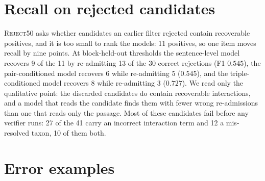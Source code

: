 \documentclass[11pt]{article}
\begin{document}
\section{Recall on rejected candidates}
\label{sec:recall}
\textsc{Reject50} asks whether candidates an earlier filter rejected contain recoverable
positives, and it is too small to rank the models: 11 positives, so one item moves recall by
nine points. At block-held-out thresholds the sentence-level model recovers 9 of the 11 by
re-admitting 13 of the 30 correct rejections (F1 $0.545$), the pair-conditioned model recovers 6
while re-admitting 5 ($0.545$), and the triple-conditioned model recovers 8 while re-admitting 3
($0.727$). We read only the qualitative point: the discarded candidates do contain recoverable
interactions, and a model that reads the candidate finds them with fewer wrong
re-admissions than one that reads only the passage. Most of these candidates fail before any
verifier runs: 27 of the 41 carry an incorrect interaction term and 12 a mis-resolved taxon, 10 of
them both.

\section{Error examples}
\label{app:examples}
\end{document}
